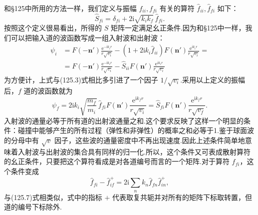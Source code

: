 和§125中所用的方法一样，我们定义与振幅 $f_{ii},f_{fi}$ 有关的算符 $\hat{f}_{ii},\hat{f}_{fi}$ 如下：
\begin{equation}
  \hat{S}_{fi}=\delta_{fi}+2\mathrm{i}\sqrt{k_ik_f}\,\hat{f}_{fi}.
\end{equation}
按照这个定义很易看出，所得的 $S$ 矩阵一定满足幺正条件.因为和§125中一样，我们可以把输入道的波函数写成一组入射波和出射波：
\begin{equation}
\begin{aligned}
  \psi_i&=F(-\boldsymbol{n}')\frac{\mathrm{e}^{-\mathrm{i}k_ir}}{r\sqrt{v_i}}
  -\left(1+2\mathrm{i}k_i\hat{f}_{ii}\right)F(\boldsymbol{n}')
  \frac{\mathrm{e}^{\mathrm{i}k_ir}}{r\sqrt{v_i}}=\\
  &=F(-\boldsymbol{n}')\frac{\mathrm{e}^{-\mathrm{i}k_ir}}{r\sqrt{v_i}}
  -\hat{S}_{ii}F(\boldsymbol{n}')\frac{\mathrm{e}^{\mathrm{i}k_ir}}{r\sqrt{v_i}}
\end{aligned}
\end{equation}
为方便计，上式与(125.3)式相比多引进了一个因子 $1/\sqrt{v_i}$.采用以上定义的振幅后，$f$ 道的波函数就为
\begin{equation}
  \psi_f=2\mathrm{i}k_i\sqrt{\frac{m_f}{m_i}}\,\hat{f}_{fi}F(\boldsymbol{n}')
  \frac{\mathrm{e}^{\mathrm{i}k_fr}}{r\sqrt{v_i}}
  =\hat{S}_{fi}F(\boldsymbol{n}')\frac{\mathrm{e}^{\mathrm{i}k_fr}}{r\sqrt{v_f}}.
\end{equation}
入射波的通量必等于所有道的出射波通量之和.这个要求反映了这样一个明显的条件：碰撞中能够产生的所有过程（弹性和非弹性）的概率之和必等于1.鉴于球面波的分母中有 $\sqrt{v}$ 因子，这些波的通量密度中不再出现速度.因此上述条件简单地意味着入射波与出射波的集合具有同样的归一化.所以，这个条件又可表成散射算符的幺正条件，只要把这个算符看成是对各道编号而言的一个矩阵.对于算符 $\hat{f}_{fi}$，这个条件变成
\begin{equation}
  \hat{f}_{fi}-\hat{f}_{if}^{+}=2\mathrm{i}\sum_nk_n\hat{f}_{fn}\hat{f}_{in}^{+},
\end{equation}
与(125.7)式相类似，式中的指标 $+$ 代表取复共轭并对所有的矩阵下标取转置，但道的编号下标除外.

